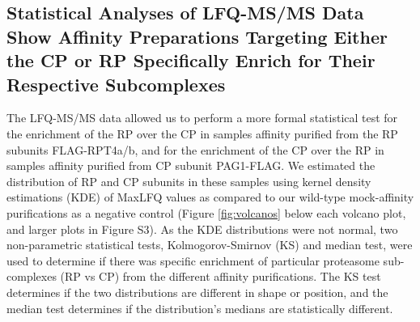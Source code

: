 \subsection{Statistical Analyses of LFQ-MS/MS Data Show Affinity Preparations Targeting Either the CP or RP Specifically Enrich for Their Respective Subcomplexes}
The LFQ-MS/MS data allowed us to perform a more formal statistical test for the enrichment of the RP over the CP in samples affinity purified from the RP subunits FLAG-RPT4a/b, and for the enrichment of the CP over the RP in samples affinity purified from CP subunit PAG1-FLAG. We estimated the distribution of RP and CP subunits in these samples using kernel density estimations (KDE) of MaxLFQ values as compared to our wild-type mock-affinity purifications as a negative control (Figure \ref{fig:volcanos} below each volcano plot, and larger plots in Figure S3).  As the KDE distributions were not normal, two non-parametric statistical tests, Kolmogorov-Smirnov (KS) and median test, were used to determine if there was specific enrichment of particular proteasome sub-complexes (RP vs CP) from the different affinity purifications. The KS test determines if the two distributions are different in shape or position, and the median test determines if the distribution’s medians are statistically different.

